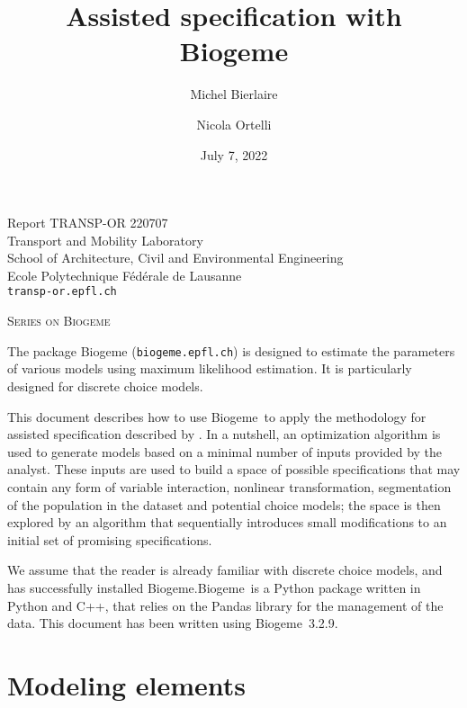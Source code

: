 \documentclass[12pt,a4paper]{article}
\title{Assisted specification with Biogeme}
\author{Michel Bierlaire \and Nicola Ortelli}
\date{July 7, 2022}
\newcommand{\PDBIOGEME}{Biogeme}
\begin{document}
\begin{titlepage}
  \pagestyle{empty}

  \maketitle
  \vspace{2cm}

  \begin{center}
    \small Report TRANSP-OR 220707 \\ Transport and Mobility Laboratory \\ School of Architecture, Civil and Environmental Engineering \\ Ecole Polytechnique F\'ed\'erale de Lausanne \\ \verb+transp-or.epfl.ch+
    \begin{center}
      \textsc{Series on Biogeme}
    \end{center}
  \end{center}


  \clearpage
\end{titlepage}


The package Biogeme (\texttt{biogeme.epfl.ch}) is designed to estimate
the parameters of various models using maximum likelihood
estimation. It is particularly designed for discrete choice
models.

This document describes how to use \PDBIOGEME\ to apply the
methodology for assisted specification described by
. In a nutshell, an optimization
algorithm is used to generate models based on a minimal
number of inputs provided by the analyst. These inputs are used to
build a space of possible specifications that may contain any form of
variable interaction, nonlinear transformation, segmentation of the
population in the dataset and potential choice models; the space is
then explored by an algorithm that sequentially introduces small
modifications to an initial set of promising specifications.

We assume that the reader is already familiar with discrete choice
models, and has successfully installed \PDBIOGEME.\@  \PDBIOGEME\ is
a Python package written in Python and C++, that relies on the
Pandas library for the management of the data.  This document has
been written using \PDBIOGEME\ 3.2.9.

\clearpage

\section{Modeling elements}
\end{document}
